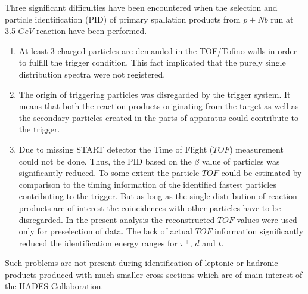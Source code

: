Three significant difficulties have been encountered when the selection and particle identification (PID)  
of primary spallation products from $p+Nb$ run at 3.5 $GeV$ reaction have been performed.
\begin{enumerate}
	\item At least 3 charged particles are demanded in the TOF/Tofino walls in order to fulfill the trigger condition. 
	This fact implicated that the purely single distribution spectra were not registered. 
	\item The origin of triggering particles was disregarded by the trigger system. 
	It means that both the reaction products originating from the target 
	as well as the secondary particles created in the parts of apparatus could contribute to the trigger.
	\item Due to missing START detector the Time of Flight ($TOF$) measurement could not be done. 
	Thus, the PID based on the $\beta$ value of particles was significantly reduced. 
    To some extent the particle $TOF$ could be estimated by comparison to the timing information 
    of the identified fastest particles contributing to the trigger. But as long as the single distribution 
    of reaction products are of interest the coincidences with other particles have to be disregarded.
    In the present analysis the reconstructed $TOF$ values were used only for preselection of data. 
    The lack of actual $TOF$ information significantly reduced the identification energy ranges for $\pi{^+}$, $d$ and $t$.	
\end{enumerate}

Such problems are not present during identification of leptonic or hadronic products 
produced with much smaller cross-sections which are of main interest of the HADES Collaboration.  

